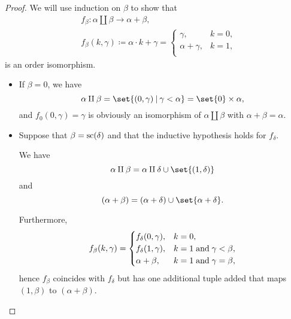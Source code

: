 \begin{proof}
  We will use induction on \( \beta \) to show that
  \begin{equation*}
    \begin{aligned}
      &f_\beta: \alpha \amalg \beta \to \alpha + \beta, \\
      &f_\beta(k, \gamma) \coloneqq \alpha \cdot k + \gamma = \begin{cases}
        \gamma,          &k = 0, \\
        \alpha + \gamma, &k = 1, \\
      \end{cases}
    \end{aligned}
  \end{equation*}
  is an order isomorphism.

  \begin{itemize}
    \item If \( \beta = 0 \), we have
    \begin{equation*}
       \alpha \amalg \beta = \set{ (0, \gamma) \given \gamma < \alpha } = \set{ 0 } \times \alpha,
    \end{equation*}
    and \( f_0(0, \gamma) = \gamma \) is obviously an isomorphism of \( \alpha \amalg \beta \) with \( \alpha + \beta = \alpha \).

    \item Suppose that \( \beta = \op{sc}(\delta) \) and that the inductive hypothesis holds for \( f_\delta \).

    We have
    \begin{equation*}
      \alpha \amalg \beta = \alpha \amalg \delta \cup \set{ (1, \delta) }
    \end{equation*}
    and
    \begin{equation*}
      (\alpha + \beta) = (\alpha + \delta) \cup \set{ \alpha + \delta }.
    \end{equation*}

    Furthermore,
    \begin{equation*}
      f_\beta(k, \gamma) = \begin{cases}
        f_\delta(0, \gamma), &k = 0, \\
        f_\delta(1, \gamma), &k = 1 \T{and} \gamma < \beta, \\
        \alpha + \beta,      &k = 1 \T{and} \gamma = \beta,
      \end{cases}
    \end{equation*}
    hence \( f_\beta \) coincides with \( f_\delta \) but has one additional tuple added that maps \( (1, \beta) \) to \( (\alpha + \beta) \).


\end{itemize}
\end{proof}
